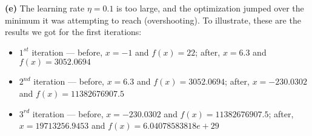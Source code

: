 \documentclass[leqno]{article}
\begin{document}
\hfill

\noindent \textbf{(e)} The learning rate $\eta = 0.1$ is too large, and the optimization jumped over the minimum it was attempting to reach (overshooting). To
illustrate, these are the results we got for the first iterations:
\begin{itemize}
\item $1^{st}$ iteration --- before, $x = -1$ and $f(x) = 22$; after, $x = 6.3$ and $f(x) = 3052.0694$
\item $2^{nd}$ iteration --- before, $x = 6.3$ and $f(x) = 3052.0694$; after, $x = -230.0302$ and $f(x) = 11382676907.5$
\item $3^{rd}$ iteration --- before, $x = -230.0302$ and $f(x) = 11382676907.5$; after, $x = 19713256.9453$ and $f(x) = 6.04078583818e+29$
\end{itemize}  

\hfill
\end{document}
